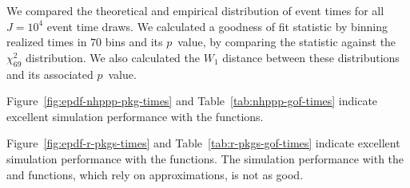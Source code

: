 \documentclass[article]{jss}\usepackage[]{graphicx}\usepackage[]{xcolor}
\begin{document}
We compared the theoretical and empirical distribution of event times for all $J=\ensuremath{10^{4}}$ event time draws. We calculated a goodness of fit statistic by binning realized times in $70$ bins and its $p$~value, by comparing the statistic against the $\chi^2_{69}$ distribution. We also calculated the $W_1$ distance between these distributions and its associated $p$~value.

Figure~\ref{fig:epdf-nhppp-pkg-times} and Table~\ref{tab:nhppp-gof-times} indicate excellent simulation performance with the  functions.

Figure~\ref{fig:epdf-r-pkgs-times} and Table~\ref{tab:r-pkgs-gof-times} indicate excellent simulation performance with the  functions. The simulation performance with the  and  functions, which rely on approximations, is not as good.







\begin{table}[ht]
\centering
{}
\caption{Goodness of fit of simulated event times with  functions for the example.} 
\label{tab:nhppp-gof-times}
\end{table}
\end{document}
